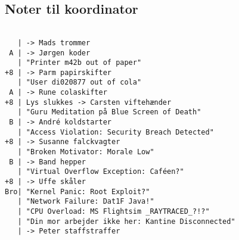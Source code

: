 \documentclass[a4paper]{article}
\begin{document}
\subsection*{Noter til koordinator}
\begin{verbatim}

   | -> Mads trommer
 A | -> Jørgen koder
   | "Printer m42b out of paper"
+8 | -> Parm papirskifter
   | "User di020877 out of cola"
 A | -> Rune colaskifter
+8 | Lys slukkes -> Carsten viftehænder
   | "Guru Meditation på Blue Screen of Death"
 B | -> André koldstarter
   | "Access Violation: Security Breach Detected"
+8 | -> Susanne falckvagter
   | "Broken Motivator: Morale Low"
 B | -> Band hepper
   | "Virtual Overflow Exception: Caféen?"
+8 | -> Uffe skåler
Bro| "Kernel Panic: Root Exploit?"
   | "Network Failure: Dat1F Java!"
   | "CPU Overload: MS Flightsim _RAYTRACED_?!?"
   | "Din mor arbejder ikke her: Kantine Disconnected"
   | -> Peter staffstraffer
\end{verbatim}


\end{document}
